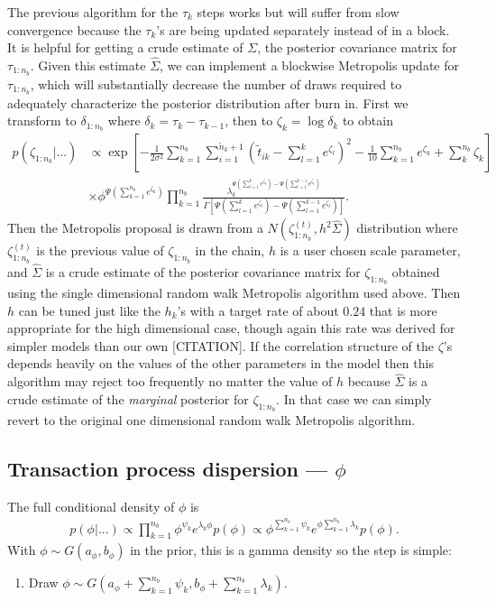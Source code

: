 \documentclass{article}
\begin{document}
The previous algorithm for the $\tau_k$ steps works but will suffer from slow convergence because the $\tau_k$'s are being updated separately instead of in a block. It is helpful for getting a crude estimate of $\Sigma$, the posterior covariance matrix for $\tau_{1:n_b}$. Given this estimate $\hat{\Sigma}$, we can implement a blockwise Metropolis update for $\tau_{1:n_b}$, which will substantially decrease the number of draws required to adequately characterize the posterior distribution after burn in. First we transform to $\delta_{1:n_b}$ where $\delta_k = \tau_k - \tau_{k-1}$, then to $\zeta_k = \log\delta_k$ to obtain
\begin{align*}
p(\zeta_{1:n_b}|...) &\propto  \exp\left[-\frac{1}{2\sigma^2}\sum_{k=1}^{n_{b}}\sum_{i=1}^{\tilde{n}_k+1}\left(\tilde{t}_{ik} - \sum_{l=1}^ke^{\zeta_l}\right)^2 - \frac{1}{10}\sum_{k=1}^{n_{b}}e^{\zeta_k} + \sum_{k}^{n_b}\zeta_k\right]\\
&\times \phi^{\Psi(\sum_{k=1}^{n_b}e^{\zeta_k})}\prod_{k=1}^{n_b}\frac{\lambda_k^{\Psi(\sum_{l=1}^{k}e^{\zeta_l})-\Psi(\sum_{l=1}^{k-1}e^{\zeta_l})}}{\Gamma\left[\Psi(\sum_{l=1}^ke^{\zeta_l}) - \Psi(\sum_{l=1}^{k-1}e^{\zeta_l})\right]}.
\end{align*}
Then the Metropolis proposal is drawn from a $N(\zeta_{1:n_b}^{(t)}, h^2\hat{\Sigma})$ distribution where $\zeta_{1:n_b}^{(t)}$ is the previous value of $\zeta_{1:n_b}$ in the chain, $h$ is a user chosen scale parameter, and $\hat{\Sigma}$ is a crude estimate of the posterior covariance matrix for $\zeta_{1:n_b}$ obtained using the single dimensional random walk Metropolis algorithm used above. Then $h$ can be tuned just like the $h_k$'s with a target rate of about $0.24$ that is more appropriate for the high dimensional case, though again this rate was derived for simpler models than our own [CITATION]. If the correlation structure of the $\zeta$'s depends heavily on the values of the other parameters in the model then this algorithm may reject too frequently no matter the value of $h$ because $\hat{\Sigma}$ is a crude estimate of the {\it marginal} posterior for $\zeta_{1:n_b}$. In that case we can simply revert to the original one dimensional random walk Metropolis algorithm.

\subsection{Transaction process dispersion --- $\phi$}
The full conditional density of $\phi$ is
\begin{align*}
p(\phi|...) \propto \prod_{k=1}^{n_{b}}\phi^{\psi_k}e^{\lambda_k\phi}p(\phi) \propto \phi^{\sum_{k=1}^{n_{b}}\psi_k}e^{\phi\sum_{k=1}^{n_{b}}\lambda_k}p(\phi).
\end{align*}
With $\phi \sim G(a_\phi, b_\phi)$ in the prior, this is a gamma density so the step is simple:
\begin{enumerate}
\item Draw $\phi \sim G\left(a_\phi + \sum_{k=1}^{n_{b}}\psi_k, b_{\phi} + \sum_{k=1}^{n_{b}}\lambda_k \right)$.
\end{enumerate}
\end{document}
